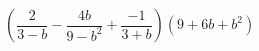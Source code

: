 \begin{ex}[type=expression]
	\begin{condition}
		\(\left( \dfrac{2}{3-b}-\dfrac{4b}{9-b^2}+\dfrac{-1}{3+b} \right)(9+6b+b^2)\)
	\end{condition}
\end{ex}
